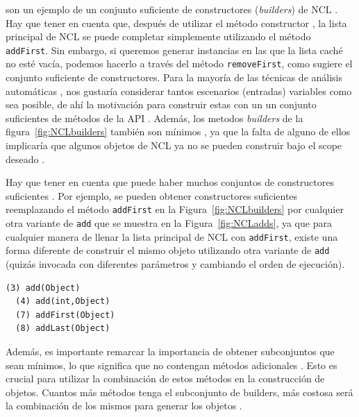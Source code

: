  son un ejemplo de un conjunto suficiente de constructores (\emph{builders}) de
 NCL .
 Hay que tener en cuenta que, después de utilizar el método constructor , la
 lista principal de NCL se puede completar simplemente utilizando el método
 \texttt{addFirst}. Sin embargo, si queremos generar instancias en las que la
 lista caché no esté vacía, podemos hacerlo a través del método
 \texttt{removeFirst}, como sugiere el conjunto suficiente de constructores.
 Para la mayoría de las técnicas de análisis automáticas ,
 nos gustaría considerar tantos escenarios (entradas) variables como sea
 posible, de ahí la motivación para construir estas con un un conjunto
 suficientes de métodos de la API . Además, los metodos \emph{builders} de la
 figura~\ref{fig:NCLbuilders} también son mínimos , ya que la falta de alguno de
 ellos implicaría que algunos objetos de NCL ya no se pueden construir bajo el
 scope deseado .

Hay que tener en cuenta que puede haber muchos conjuntos de constructores suficientes . Por ejemplo, se pueden obtener constructores suficientes reemplazando el método \texttt{addFirst} en la Figura~\ref{fig:NCLbuilders} por cualquier otra variante de \texttt{add} que se muestra en la Figura~\ref{fig:NCLadds}, ya que para cualquier manera de llenar la lista principal de NCL con \texttt{addFirst}, existe una forma diferente de construir el mismo objeto utilizando otra variante de \texttt{add} (quizás invocada con diferentes parámetros y cambiando el orden de ejecución).
\\
\begin{lstlisting}[numbers=none,label=fig:NCLadds, caption=Variantes del método 'Add' que puedo ser utilizado para rellanar la lista principal en NCL, captionpos=b, frame=tb , basicstyle=\scriptsize]
  (3) add(Object)
  (4) add(int,Object)
  (7) addFirst(Object)
  (8) addLast(Object)
\end{lstlisting}

Además, es importante remarcar la importancia de obtener subconjuntos que sean
mínimos, lo que significa que 
no contengan métodos adicionales . Esto es crucial para
utilizar la combinación de estos métodos en la construcción de objetos. Cuantos
más métodos tenga el subconjunto de builders, más costosa será la combinación de
los mismos para generar los objetos .

